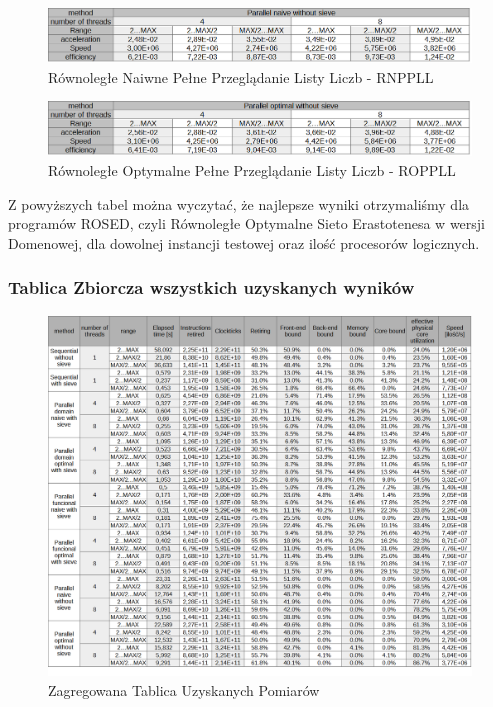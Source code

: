 \documentclass{article}
\begin{document}
                \begin{figure}[H]
                    \caption{Równoległe Naiwne Pełne Przeglądanie Listy Liczb - \gls{RNPPLL}}
                    \includegraphics[width=13cm]{parallel-naive-without-sieve.png}
                \end{figure}
                \begin{figure}[H]
                    \caption{Równoległe Optymalne Pełne Przeglądanie Listy Liczb - \gls{ROPPLL}}
                    \includegraphics[width=13cm]{parallel-optimal-without-sieve.png}
                \end{figure}
                
                Z powyższych tabel można wyczytać, że najlepsze wyniki otrzymaliśmy dla programów \gls{ROSED}, czyli Równoległe Optymalne Sieto Erastotenesa w wersji Domenowej, dla dowolnej instancji testowej oraz ilość procesorów logicznych.
                
            \subsubsection{Tablica Zbiorcza wszystkich uzyskanych wyników}
            \begin{figure}[H]
                \includegraphics[width=13cm]{wyniki-agr.png}
                \caption{Zagregowana Tablica Uzyskanych Pomiarów}
            \end{figure}
            
\end{document}
